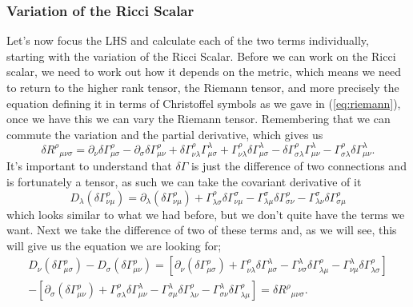 \documentclass[12pt]{article}
\numberwithin{equation}{section}
\numberwithin{figure}{section}
\begin{document}
\subsubsection{Variation of the Ricci Scalar} %
\label{subsub:variation_of_the_ricci_scalar}
Let's now focus the LHS and calculate each of the two terms individually, starting with the variation of the Ricci Scalar. Before we can work on the Ricci scalar, we need to work out how it depends on the metric, which means we need to return to the higher rank tensor, the Riemann tensor, and more precisely the equation defining it in terms of Christoffel symbols as we gave in (\ref{eq:riemann}), once we have this we can vary the Riemann tensor. Remembering that we can commute the variation and the partial derivative, which gives us
\begin{equation}
	\delta {R^\rho}_{\mu\nu\sigma} = \partial_\nu \delta\Gamma^{\rho}_{\mu\sigma} - \partial_\sigma \delta\Gamma^{\rho}_{\mu\nu} + \delta\Gamma^{\rho}_{\nu \lambda}\Gamma^{\lambda}_{\mu\sigma} + \Gamma^{\rho}_{\nu \lambda}\delta\Gamma^{\lambda}_{\mu\sigma} - \delta\Gamma^{\rho}_{\sigma \lambda}\Gamma^{\lambda}_{\mu \nu} - \Gamma^{\rho}_{\sigma \lambda}\delta\Gamma^{\lambda}_{\mu \nu}.
\end{equation}
It's important to understand that $\delta\Gamma$ is just the difference of two connections and is fortunately a tensor, as such we can take the covariant derivative of it
\begin{equation}
	D_\lambda(\delta \Gamma^\rho_{\nu\mu}) = \partial_\lambda(\delta \Gamma^{\rho}_{\nu\mu}) +\Gamma^{\rho}_{\lambda\sigma}\delta \Gamma^{\sigma}_{\nu\mu} - \Gamma^{\sigma}_{\lambda\mu}\delta \Gamma^{\rho}_{\sigma\nu} - \Gamma^{\sigma}_{\lambda\nu}\delta \Gamma^{\rho}_{\sigma\mu}
\end{equation}
which looks similar to what we had before, but we don't quite have the terms we want. Next we take the difference of two of these terms and, as we will see, this will give us the equation we are looking for;
\begin{multline}
 	D_\nu(\delta \Gamma^\rho_{\mu\sigma}) - D_\sigma(\delta \Gamma^\rho_{\mu\nu}) = \left[\partial_\nu(\delta \Gamma^{\rho}_{\mu\sigma}) + \Gamma^{\rho}_{\nu\lambda}\delta \Gamma^{\lambda}_{\mu\sigma} - \Gamma^{\lambda}_{\nu\sigma}\delta \Gamma^{\rho}_{\lambda\mu} - \Gamma^{\lambda}_{\nu\mu}\delta \Gamma^{\rho}_{\lambda\sigma}\right] \\- \left[\partial_\sigma(\delta \Gamma^{\rho}_{\mu\nu}) + \Gamma^{\rho}_{\sigma\lambda}\delta \Gamma^{\lambda}_{\mu\nu} - \Gamma^{\lambda}_{\sigma\mu}\delta \Gamma^{\rho}_{\lambda\nu} - \Gamma^{\lambda}_{\sigma\nu}\delta \Gamma^{\rho}_{\lambda\mu}\right] = \delta {R^\rho}_{\mu\nu\sigma}. \label{eq:delta_riemann}
\end{multline} 
\end{document}
